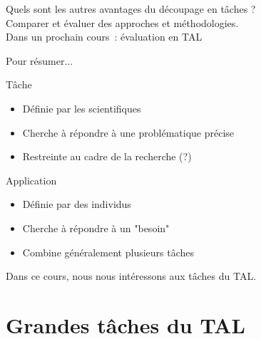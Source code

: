 \documentclass[serif, aspectratio=169]{beamer}
\begin{document}
\begin{exoframe}
    \begin{center}
        \Large
        Quels sont les autres avantages du découpage en tâches ? \\
        \pause
        \vspace{20pt}
        Comparer et évaluer des approches et méthodologies. \\ Dans un prochain cours~: évaluation en TAL
    \end{center}
\end{exoframe}

\begin{frame}{Pour résumer...}
    \begin{block}{Tâche}
        \begin{itemize}
            \pause
            \item Définie par les scientifiques
            \pause
            \item Cherche à répondre à une problématique précise
            \pause
            \item Restreinte au cadre de la recherche (?)
        \end{itemize}
    \end{block}
    \begin{block}{Application}
        \begin{itemize}
            \pause
            \item Définie par des individus
            \pause
            \item Cherche à répondre à un "besoin"
            \pause
            \item Combine généralement plusieurs tâches
        \end{itemize}
    \end{block}
    \pause
    \begin{center}
        \Large
        Dans ce cours, nous nous intéressons aux tâches du TAL.
    \end{center}
\end{frame}

\section{Grandes tâches du TAL}
\end{document}
